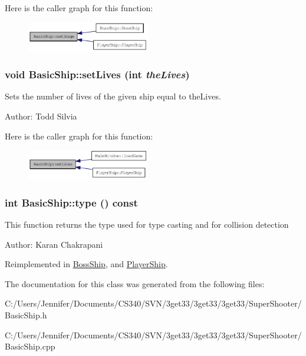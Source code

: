 Here is the caller graph for this function:\nopagebreak
\begin{figure}[H]
\begin{center}
\leavevmode
\includegraphics[width=152pt]{class_basic_ship_ad0dc07d6f5934c938efd31be0ca56a06_icgraph}
\end{center}
\end{figure}
\hypertarget{class_basic_ship_a4f4ffdf5a17c9148478ada53b06d3e2e}{
\subsubsection[{setLives}]{\setlength{\rightskip}{0pt plus 5cm}void BasicShip::setLives (int {\em theLives})}}
\label{class_basic_ship_a4f4ffdf5a17c9148478ada53b06d3e2e}
Sets the number of lives of the given ship equal to theLives.

Author: Todd Silvia 

Here is the caller graph for this function:\nopagebreak
\begin{figure}[H]
\begin{center}
\leavevmode
\includegraphics[width=152pt]{class_basic_ship_a4f4ffdf5a17c9148478ada53b06d3e2e_icgraph}
\end{center}
\end{figure}
\hypertarget{class_basic_ship_a6d498fc95af4562fcec7273897f98067}{
\subsubsection[{type}]{\setlength{\rightskip}{0pt plus 5cm}int BasicShip::type () const}}
\label{class_basic_ship_a6d498fc95af4562fcec7273897f98067}
This function returns the type used for type casting and for collision detection

Author: Karan Chakrapani 

Reimplemented in \hyperlink{class_boss_ship_aa6e1eb6f89978d9608560c8bfacc4906}{BossShip}, and \hyperlink{class_player_ship_a81bc25f1369bf55d02c3f71b312b70a4}{PlayerShip}.

The documentation for this class was generated from the following files:\begin{DoxyCompactItemize}
\item 
C:/Users/Jennifer/Documents/CS340/SVN/3get33/3get33/3get33/SuperShooter/BasicShip.h\item 
C:/Users/Jennifer/Documents/CS340/SVN/3get33/3get33/3get33/SuperShooter/BasicShip.cpp\end{DoxyCompactItemize}
